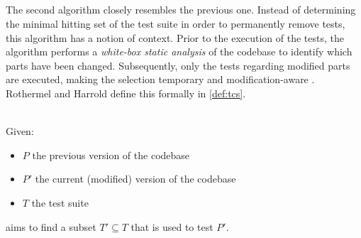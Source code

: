 
\subsection{\tcs{}}
The second algorithm closely resembles the previous one. Instead of determining the minimal hitting set of the test suite in order to permanently remove tests, this algorithm has a notion of context. Prior to the execution of the tests, the algorithm performs a \emph{white-box static analysis} of the codebase to identify which parts have been changed. Subsequently, only the tests regarding modified parts are executed, making the selection temporary and modification-aware \cite{10.1002/stv.430}. Rothermel and Harrold define this formally in \autoref{def:tcs}.

\begin{definition}[\tcs{}]
\label{def:tcs}
\mbox{}\\Given:
\begin{itemize}
	\item $P$ the previous version of the codebase
	\item $P'$ the current (modified) version of the codebase
	\item $T$ the test suite
\end{itemize}

\noindent \tcs{} aims to find a subset $T' \subseteq T$ that is used to test $P'$. 
\end{definition}